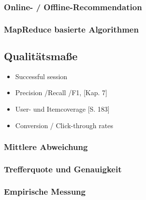 \citep{Vidal:2005:PDR:2137725.2137737}
\citep{Toscher:2008:INA:1722149.1722153}
\citep{linden03}

\subsubsection{Online- / Offline-Recommendation}
\subsubsection{MapReduce basierte Algorithmen}
\citep{mapred008}

\subsection{Qualitätsmaße}\label{sec:measures}

	\begin{itemize}
	\item Successful session \citep{hb_18,Smyth05alive-user}
	\item Precision /Recall /F1, \citep{rs}[Kap. 7]
	\item User- und Itemcoverage \citep{rs}[S. 183]
	\item Conversion / Click-through rates
	\end{itemize}

\subsubsection{Mittlere Abweichung}\newpage
\subsubsection{Trefferquote und Genauigkeit}\newpage
\subsubsection{Empirische Messung}\newpage

\newpage
